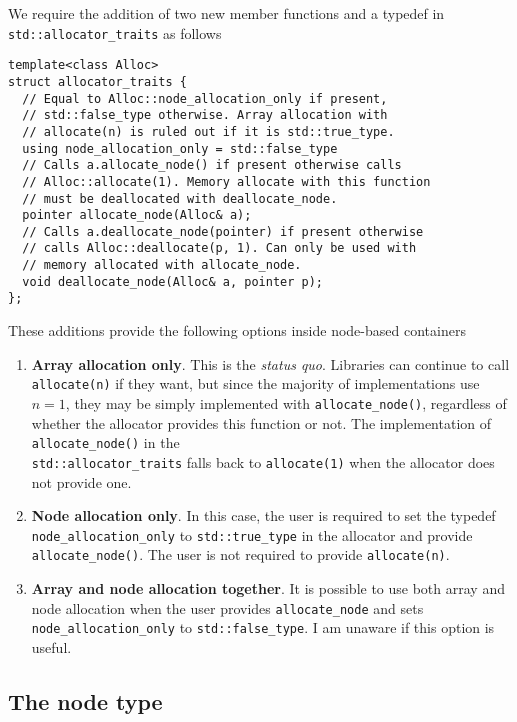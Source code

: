 \documentclass[11pt]{article}
\begin{document}
We require the addition of two new member functions and
a typedef in \texttt{std::allocator\_traits} as follows

\begin{lstlisting}
template<class Alloc>
struct allocator_traits {
  // Equal to Alloc::node_allocation_only if present,
  // std::false_type otherwise. Array allocation with
  // allocate(n) is ruled out if it is std::true_type.
  using node_allocation_only = std::false_type
  // Calls a.allocate_node() if present otherwise calls
  // Alloc::allocate(1). Memory allocate with this function
  // must be deallocated with deallocate_node.
  pointer allocate_node(Alloc& a);
  // Calls a.deallocate_node(pointer) if present otherwise
  // calls Alloc::deallocate(p, 1). Can only be used with
  // memory allocated with allocate_node.
  void deallocate_node(Alloc& a, pointer p);
};
\end{lstlisting}
These additions provide the following options inside node-based
containers
\begin{enumerate}
\item {\bf Array allocation only}.
This is the {\it status quo}. Libraries can continue to call
\texttt{allocate(n)} if they want, but since the majority of implementations
use $n = 1$, they may be simply implemented with
\texttt{allocate\_node()}, regardless of whether the allocator provides this
function or not. The implementation of \texttt{allocate\_node()} in the\\
\texttt{std::allocator\_traits} falls back to \texttt{allocate(1)} when the
allocator does not provide one.

\item {\bf Node allocation only}.
In this case, the user is required to set the typedef \texttt{node\_allocation\_only}
to \texttt{std::true\_type} in the allocator and provide \texttt{allocate\_node()}. The user is
not required to provide \texttt{allocate(n)}.
\item {\bf Array and node allocation together}. It is possible to use
both array {and} node allocation when the user provides \texttt{allocate\_node}
and sets \texttt{node\_allocation\_only} to \texttt{std::false\_type}.
I am unaware if this option is useful.
\end{enumerate}

\subsection{The node type}
\end{document}
